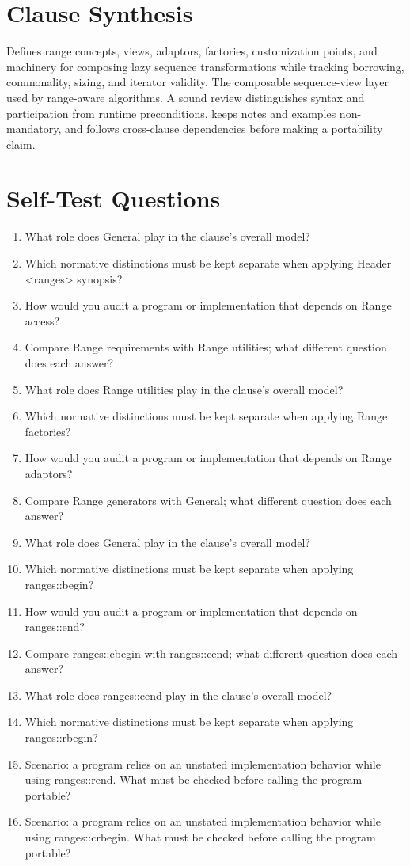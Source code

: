 \documentclass[11pt,letterpaper]{article}
\begin{document}
\section{Clause Synthesis}
\begin{CornellReferenceOrientationBox}Defines range concepts, views, adaptors, factories, customization points, and machinery for composing lazy sequence transformations while tracking borrowing, commonality, sizing, and iterator validity. The composable sequence-view layer used by range-aware algorithms. A sound review distinguishes syntax and participation from runtime preconditions, keeps notes and examples non-mandatory, and follows cross-clause dependencies before making a portability claim.\end{CornellReferenceOrientationBox}
\section{Self-Test Questions}
\begin{enumerate}
\item What role does General play in the clause's overall model?
\item Which normative distinctions must be kept separate when applying Header <ranges> synopsis?
\item How would you audit a program or implementation that depends on Range access?
\item Compare Range requirements with Range utilities; what different question does each answer?
\item What role does Range utilities play in the clause's overall model?
\item Which normative distinctions must be kept separate when applying Range factories?
\item How would you audit a program or implementation that depends on Range adaptors?
\item Compare Range generators with General; what different question does each answer?
\item What role does General play in the clause's overall model?
\item Which normative distinctions must be kept separate when applying ranges::begin?
\item How would you audit a program or implementation that depends on ranges::end?
\item Compare ranges::cbegin with ranges::cend; what different question does each answer?
\item What role does ranges::cend play in the clause's overall model?
\item Which normative distinctions must be kept separate when applying ranges::rbegin?
\item Scenario: a program relies on an unstated implementation behavior while using ranges::rend. What must be checked before calling the program portable?
\item Scenario: a program relies on an unstated implementation behavior while using ranges::crbegin. What must be checked before calling the program portable?
\end{enumerate}
\end{document}
